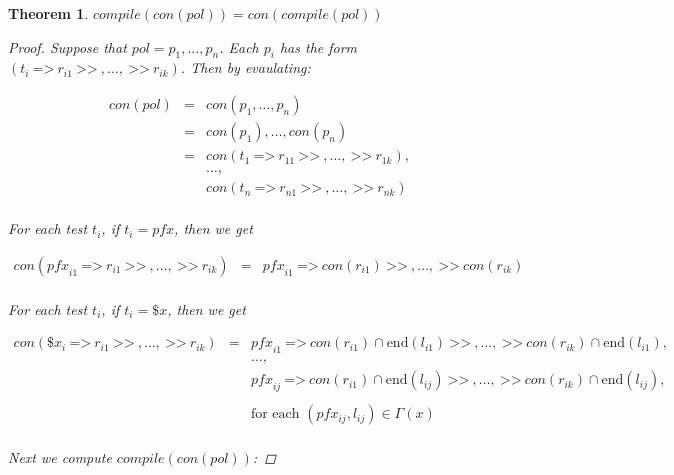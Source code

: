 \documentclass[twocolumn]{sig-alternate-10pt}
\newcommand{\Prefer}{\texttt{>>}}
\newcommand{\Path}{\texttt{=>}}
\newtheorem{thm}{Theorem}[section]
\begin{document}
\begin{thm}
  $compile(con(pol)) = con(compile(pol))$

  \begin{proof} \text{ }

    Suppose that $pol = p_1, \dots, p_n$. Each $p_i$ has the form $(t_i ~\Path~ r_{i1} ~\Prefer~,\dots, ~\Prefer~ r_{ik})$. Then by evaulating:

    \[ \begin{array}{lcl}
      con(pol) & = & con(p_1,\dots,p_n) \\
               & = & con(p_1), \dots, con(p_n) \\
               & = & con(t_1 ~\Path~ r_{11} ~\Prefer~,\dots, ~\Prefer~ r_{1k}), \\
               &   & \dots, \\
               &   & con(t_n ~\Path~ r_{n1} ~\Prefer~,\dots, ~\Prefer~ r_{nk}) \\
    \end{array} \]

    For each test $t_i$, if $t_i = pfx$, then we get 

    \[ \begin{array}{lcl}
        con({pfx}_{i1} ~\Path~ r_{i1} ~\Prefer~,\dots, ~\Prefer~ r_{ik}) 
           & = & {pfx}_{i1} ~\Path~ con(r_{i1}) ~\Prefer~,\dots, ~\Prefer~ con(r_{ik}) \\
    \end{array} \]

    For each test $t_i$, if $t_i = \$x$, then we get

    \[ \begin{array}{lcl}
        con(\$x_{i} ~\Path~ r_{i1} ~\Prefer~,\dots, ~\Prefer~ r_{ik}) 
            & = & {pfx}_{i1} ~\Path~ con(r_{i1}) \cap \text{end}(l_{i1}) ~\Prefer~,\dots, ~\Prefer~ con(r_{ik}) \cap \text{end}(l_{i1}), \\
            &   & \dots, \\ 
            &   & {pfx}_{ij} ~\Path~ con(r_{i1}) \cap \text{end}(l_{ij}) ~\Prefer~,\dots, ~\Prefer~ con(r_{ik}) \cap \text{end}(l_{ij}), \\
            &   & \\
            &   & \text{for each } (pfx_{ij}, l_{ij}) \in \Gamma(x) \\
    \end{array} \]

    Next we compute $compile(con(pol))$:


\end{proof}
\end{thm}
\end{document}

